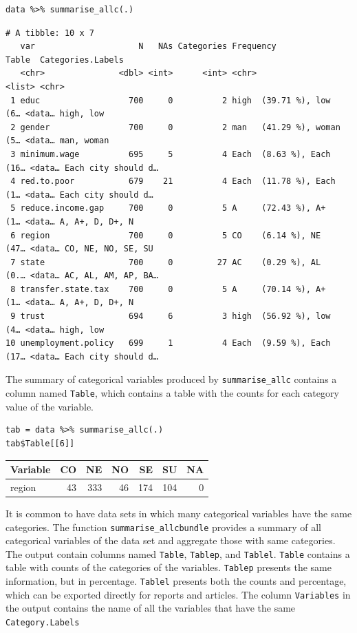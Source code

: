 \documentclass[a4paper]{article}
\begin{document}
\lstset{numbers=left,language=r,label=orgab6af77,caption= ,captionpos=b}
\begin{lstlisting}
data %>% summarise_allc(.)
\end{lstlisting}

\begin{verbatim}
# A tibble: 10 x 7
   var                     N   NAs Categories Frequency                  Table  Categories.Labels  
   <chr>               <dbl> <int>      <int> <chr>                      <list> <chr>              
 1 educ                  700     0          2 high  (39.71 %), low   (6… <data… high, low          
 2 gender                700     0          2 man   (41.29 %), woman (5… <data… man, woman         
 3 minimum.wage          695     5          4 Each  (8.63 %), Each  (16… <data… Each city should d…
 4 red.to.poor           679    21          4 Each  (11.78 %), Each  (1… <data… Each city should d…
 5 reduce.income.gap     700     0          5 A     (72.43 %), A+    (1… <data… A, A+, D, D+, N    
 6 region                700     0          5 CO    (6.14 %), NE    (47… <data… CO, NE, NO, SE, SU 
 7 state                 700     0         27 AC    (0.29 %), AL    (0.… <data… AC, AL, AM, AP, BA…
 8 transfer.state.tax    700     0          5 A     (70.14 %), A+    (1… <data… A, A+, D, D+, N    
 9 trust                 694     6          3 high  (56.92 %), low   (4… <data… high, low          
10 unemployment.policy   699     1          4 Each  (9.59 %), Each  (17… <data… Each city should d…
\end{verbatim}

The summary of categorical variables produced by \texttt{summarise\_allc} contains a column named \texttt{Table}, which contains a table with the counts for each category value of the variable.

\lstset{numbers=left,language=r,label=org30b3022,caption= ,captionpos=b}
\begin{lstlisting}
tab = data %>% summarise_allc(.)
tab$Table[[6]]
\end{lstlisting}

\begin{center}
\begin{tabular}{lrrrrrr}
Variable & CO & NE & NO & SE & SU & NA\\
\hline
region & 43 & 333 & 46 & 174 & 104 & 0\\
\end{tabular}
\end{center}

It is common to have data sets in which many categorical variables have the same categories. The function \texttt{summarise\_allcbundle} provides a summary of all categorical variables of the data set and aggregate those with same categories. The output contain columns named \texttt{Table}, \texttt{Tablep}, and \texttt{Tablel}. \texttt{Table} contains a table with counts of the categories of the variables. \texttt{Tablep} presents the same information, but in percentage. \texttt{Tablel} presents both the counts and percentage, which can be exported directly for reports and articles. The column \texttt{Variables} in the output contains the name of all the variables that have the same \texttt{Category.Labels}
\end{document}
